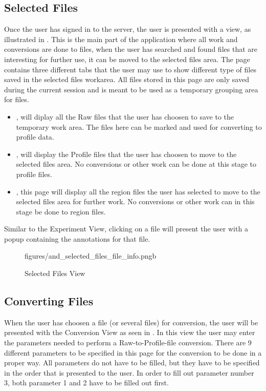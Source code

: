 \subsection{Selected Files}\label{sec:and_manual_selected}
Once the user has signed in to the server, the user is presented with a  view, as illustrated in .
This is the main part of the application where all work and conversions are done to files, when the user has searched and found files that are interesting for further use, it can be moved to the selected files area. 
The page contains three different tabs that the user may use to show different type of files saved in the selected files workarea. All files stored in this page are only saved during the current session and is meant to be used as a temporary grouping area for files. 

\begin{itemize}

	\item {}, will diplay all the Raw files that the user has choosen to save to the temporary work area. The files here can be marked and used for converting to profile data.
    \item {}, will display the Profile files that the user has choosen to move to the selected files area. No conversions or other work can be done at this stage to profile files.
    \item {}, this page will display all the region files the user has selected to move to the selected files area for further work. No conversions or other work can in this stage be done to region files.
    
\end{itemize}

Similar to the Experiment View, clicking on a file will present the user with a popup containing the annotations for that file.


\begin{figure}[h]
		{figures/and_selected_files_file_info.png}{b}
\caption{Selected Files View}
\label{fig:and_selected_man}
\end{figure}
\FloatBarrier


\subsection{Converting Files}
When the user has choosen a file (or several files) for conversion, the user will be presented with the Conversion View as seen in . In this view the user may enter the parameters needed to perform a Raw-to-Profile-file conversion.
\newline
There are 9 different parameters to be specified in this page for the conversion to be done in a proper way. All parameters do not have to be filled, but they have to be specified in the order that is presented to the user. In order to fill out parameter number 3, both parameter 1 and 2 have to be filled out first.

